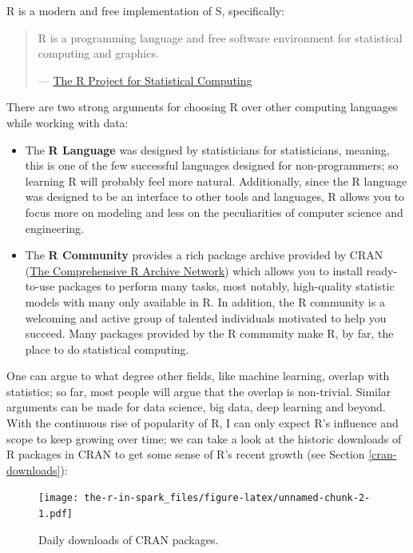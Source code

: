 \documentclass[]{book}
\providecommand{\tightlist}{%
  \setlength{\itemsep}{0pt}\setlength{\parskip}{0pt}}
\theoremstyle{definition}
\theoremstyle{definition}
\theoremstyle{definition}
\theoremstyle{remark}
\begin{document}
R is a modern and free implementation of S, specifically:

\begin{quote}
R is a programming language and free software environment for
statistical computing and graphics.

--- \href{https://www.r-project.org/}{The R Project for Statistical
Computing}
\end{quote}

There are two strong arguments for choosing R over other computing
languages while working with data:

\begin{itemize}
\tightlist
\item
  The \textbf{R Language} was designed by statisticians for
  statisticians, meaning, this is one of the few successful languages
  designed for non-programmers; so learning R will probably feel more
  natural. Additionally, since the R language was designed to be an
  interface to other tools and languages, R allows you to focus more on
  modeling and less on the peculiarities of computer science and
  engineering.
\item
  The \textbf{R Community} provides a rich package archive provided by
  CRAN (\href{https://cran.r-project.org/}{The Comprehensive R Archive
  Network}) which allows you to install ready-to-use packages to perform
  many tasks, most notably, high-quality statistic models with many only
  available in R. In addition, the R community is a welcoming and active
  group of talented individuals motivated to help you succeed. Many
  packages provided by the R community make R, by far, the place to do
  statistical computing.
\end{itemize}

One can argue to what degree other fields, like machine learning,
overlap with statistics; so far, most people will argue that the overlap
is non-trivial. Similar arguments can be made for data science, big
data, deep learning and beyond. With the continuous rise of popularity
of R, I can only expect R's influence and scope to keep growing over
time; we can take a look at the historic downloads of R packages in CRAN
to get some sense of R's recent growth (see Section
\ref{cran-downloads}):

\begin{figure}
\centering
\texttt{[image: the-r-in-spark\_files/figure-latex/unnamed-chunk-2-1.pdf]}
\caption{\label{fig:unnamed-chunk-2}Daily downloads of CRAN packages.}
\end{figure}
\end{document}
